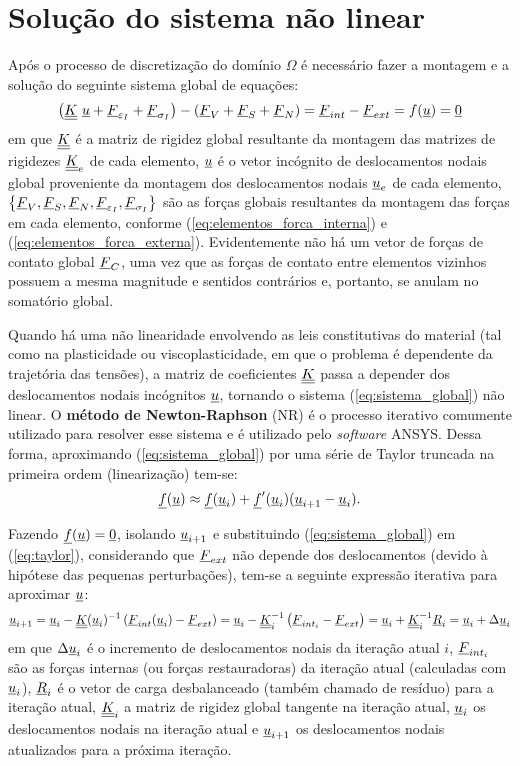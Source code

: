 \section{Solução do sistema não linear}
\label{cap: solução do sistema}

Após o processo de discretização do domínio $\Omega$ é necessário fazer a montagem e a solução do seguinte sistema global de equações:
\begin{equation}
	\label{eq:sistema_global}
	\left(\underline{\underline K}~\underline u + \underline{F}_{\varepsilon_{I}} + \underline{F}_{\sigma_{I}}\right) - \left(\underline{F}_V+\underline{F}_S+\underline{F}_N \right) = \underline{F}_{int} - \underline{F}_{ext} = f(\underline u) = \underline{0}  
\end{equation}
em que $\underline{\underline K}$ é a matriz de rigidez global resultante da montagem das matrizes de rigidezes $\underline{\underline K}_e$ de cada elemento, $\underline u$ é o vetor incógnito de deslocamentos nodais global proveniente da montagem dos deslocamentos nodais $\underline u_e$ de cada elemento, $\left\{\underline{F}_V,\underline{F}_S,\underline{F}_N,\underline{F}_{\varepsilon_I},\underline{F}_{\sigma_I} \right\}$ são as forças globais resultantes da montagem das forças em cada elemento, conforme (\ref{eq:elementos_forca_interna}) e (\ref{eq:elementos_forca_externa}). Evidentemente não há um vetor de forças de contato global $\underline{F}_C$, uma vez que as forças de contato entre elementos vizinhos possuem a mesma magnitude e sentidos contrários e, portanto, se anulam no somatório global.

Quando há uma não linearidade envolvendo as leis constitutivas do material (tal como na plasticidade ou viscoplasticidade, em que o problema é dependente da trajetória das tensões), a matriz de coeficientes $\underline{\underline K}$ passa a depender dos deslocamentos nodais incógnitos  $\underline u$, tornando o sistema (\ref{eq:sistema_global}) não linear. O \textbf{método de Newton-Raphson} (NR) é o processo iterativo comumente utilizado para resolver esse sistema e é utilizado pelo \textit{software} ANSYS. Dessa forma, aproximando (\ref{eq:sistema_global}) por uma série de Taylor truncada na primeira ordem (linearização) tem-se:
\begin{equation}
	\label{eq:taylor}
	\underline f(\underline u) \approx \underline f(\underline u_i) + \underline f'(\underline u_i)(\underline u_{i+1}-\underline u_i).
\end{equation}

Fazendo $\underline f(\underline u) = \underline{0}$, isolando $\underline u_{i+1}$ e substituindo (\ref{eq:sistema_global}) em (\ref{eq:taylor}), considerando que $\underline{F}_{ext}$ não depende dos deslocamentos (devido à hipótese das pequenas perturbações), tem-se a seguinte expressão iterativa para aproximar $\underline u$:
\begin{equation}
	\label{eq:NR}
	\underline u_{i+1} = \underline u_i - \underline{\underline K}(\underline u_i)^{-1}\left(\underline{F}_{int}(\underline u_i)-\underline{F}_{ext} \right) = \underline u_i - \underline{\underline K}_i^{-1} \left(\underline{F}_{int_i} - \underline{F}_{ext} \right) = \underline u_i + \underline{\underline K}_i^{-1}\underline{R}_i = \underline u_i + \Delta \underline u_i
\end{equation}
em que $\Delta \underline u_i$ é o incremento de deslocamentos nodais da iteração atual $i$, $\underline{F}_{int_i}$ são as forças internas (ou forças restauradoras) da iteração atual (calculadas com $\underline u_i$), $\underline{R}_i$ é o vetor de carga desbalanceado (também chamado de resíduo) para a iteração atual, $\underline{\underline K}_i$ a matriz de rigidez global tangente na iteração atual, $\underline u_i$ os deslocamentos nodais na iteração atual e $\underline u_{i+1}$ os deslocamentos nodais atualizados para a próxima iteração.

